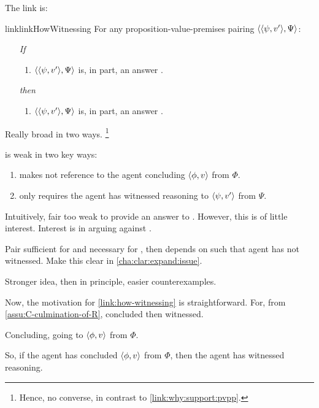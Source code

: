 \begin{note}
  The link is:

  \begin{restatable}{link}{linkHowWitnessing}
    \label{link:how-witnessing}
    For any proposition-value-premises pairing \(\langle \langle \psi, v' \rangle, \Psi \rangle\):
    \begin{itemize}
    \item[\emph{If}]
      \begin{enumerate}[label=\alph*., ref=(\alph*)]
      \item
        \(\langle \langle \psi, v' \rangle, \Psi \rangle\) is, in part, an answer \qHow{}.
      \end{enumerate}
    \item[\emph{then}]
      \begin{enumerate}[label=\alph*., ref=(\alph*), resume]
      \item
        \(\langle \langle \psi, v' \rangle, \Psi \rangle\) is, in part, an answer \qHowV{}.
      \end{enumerate}
    \end{itemize}
    \vspace{-\baselineskip}
  \end{restatable}

  Really broad in two ways.%
  \footnote{
    Hence, no converse, in contrast to \autoref{link:why:support:pvpp}.
  }

  \qHowV{} is weak in two key ways:
  \begin{enumerate}
  \item
    \qHowV{} makes not reference to the agent concluding \(\langle \phi, v \rangle\) from \(\Phi\).
  \item
    \qHowV{} only requires the agent has witnessed reasoning to \(\langle \psi, v' \rangle\) from \(\Psi\).
  \end{enumerate}

  Intuitively, fair too weak to provide an answer to \qWhy{}.
  However, this is of little interest.
  Interest is in arguing against \issueInclusion{}.

  Pair sufficient for \qWhy{} and necessary for \qHow{}, then depends on \support{} such that agent has not witnessed.
  Make this clear in \autoref{cha:clar:expand:issue}.

  Stronger idea, then in principle, easier counterexamples.
\end{note}

\begin{note}
  Now, the motivation for \autoref{link:how-witnessing} is straightforward.
  For, from \autoref{assu:C-culmination-of-R}, concluded then witnessed.

  Concluding, going to \(\langle \phi, v \rangle\) from \(\Phi\).

  So, if the agent has concluded \(\langle \phi, v \rangle\) from \(\Phi\), then the agent has witnessed reasoning.
\end{note}

